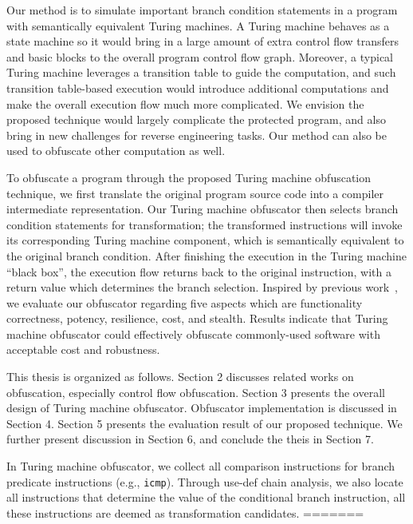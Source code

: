 Our method is to simulate important branch condition statements in a
program with semantically equivalent Turing machines. A Turing machine
behaves as a state machine so it would bring in a large amount of extra control
flow transfers and basic blocks to the overall program control flow graph.
Moreover, a typical Turing machine leverages a transition table to guide the
computation, and such transition table-based execution would introduce
additional computations and make the overall execution flow much more
complicated. We envision the proposed technique would largely complicate the
protected program, and also bring in new challenges for reverse engineering
tasks. Our method can also be used to obfuscate other computation as well.

To obfuscate a program through the proposed Turing machine obfuscation
technique, we first translate the original program source code into a compiler
intermediate representation. Our Turing machine obfuscator then selects branch
condition statements for transformation; the transformed instructions will invoke its
corresponding Turing machine component, which is semantically equivalent to the
original branch condition. After finishing the execution in the Turing machine
``black box'', the execution flow returns back to the original instruction, with
a return value which determines the branch selection. Inspired by previous
work~\cite{Collberg}, we evaluate our obfuscator regarding five aspects which
are functionality correctness, potency, resilience, cost, and stealth. Results
indicate that Turing machine obfuscator could effectively obfuscate
commonly-used software with acceptable cost and robustness.

This thesis is organized as follows. Section 2 discusses related works on
obfuscation, especially control flow obfuscation. Section 3 presents the overall
design of Turing machine obfuscator. Obfuscator implementation is discussed in
Section 4. Section 5 presents the evaluation result of our proposed technique.
We further present discussion in Section 6, and conclude the theis in Section 7.



In Turing machine obfuscator, we collect all comparison instructions for branch
predicate instructions (e.g., \texttt{icmp}). Through use-def chain analysis,
we also locate all instructions that determine the value of the conditional
branch instruction, all these instructions are deemed as transformation
candidates.
=======
